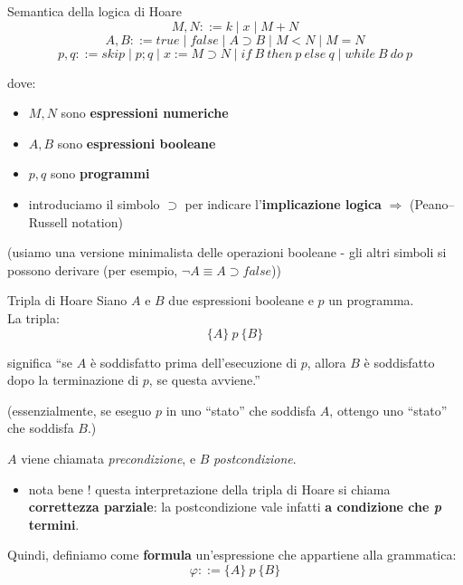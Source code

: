 \documentclass[a4paper,11pt]{report}
\begin{document}
\begin{defframe}{Semantica della logica di Hoare}{}
    \[
        M, N ::= k \mid x \mid M + N
    \]  
    \[
        A, B ::= true \mid false \mid A \supset B \mid M < N \mid M = N
    \]    
    \[
        p, q ::= skip \mid p;q \mid x := M \supset N \mid if \ B \ then \ p \ else \ q \mid while \ B \ do \ p 
    \]

    dove:
    \begin{itemize}
        \item \( M, N \) sono \textbf{espressioni numeriche}
        \item \( A, B \) sono \textbf{espressioni booleane}
        \item \( p, q\) sono \textbf{programmi}
        \item introduciamo il simbolo \( \supset \) per indicare l'\textbf{implicazione logica} \( \Rightarrow \) (Peano–Russell notation)
    \end{itemize}
    (usiamo una versione minimalista delle operazioni booleane - gli altri simboli si possono derivare (per esempio, \( \neg A \equiv A \supset false \)))
\end{defframe}

\begin{defframe}{Tripla di Hoare}{}
    Siano \( A \) e \( B \) due espressioni booleane e \( p \) un programma.\\
    La tripla:
    \[ \{A\} \ p \ \{B\} \]

    significa ``se \( A \) è soddisfatto prima dell'esecuzione di \( p \), allora \( B \) è soddisfatto dopo la terminazione di \( p \), se questa avviene.''

    {\small \color{gray}(essenzialmente, se eseguo \( p \) in uno ``stato'' che soddisfa \( A \), ottengo uno ``stato'' che soddisfa \( B \).)}

    \( A \) viene chiamata \textit{precondizione}, e \( B \) \textit{postcondizione}.

    \begin{gframe}{}
        \begin{itemize}
            \item nota bene ! questa interpretazione della tripla di Hoare si chiama \textbf{correttezza parziale}: la postcondizione vale infatti \textbf{a condizione che \textit{p} termini}.
        \end{itemize}
    \end{gframe}

Quindi, definiamo come \textbf{formula} un'espressione che appartiene alla grammatica:
\[ \varphi ::= \{A\} \ p \ \{B\} \]

\end{defframe}
\end{document}
